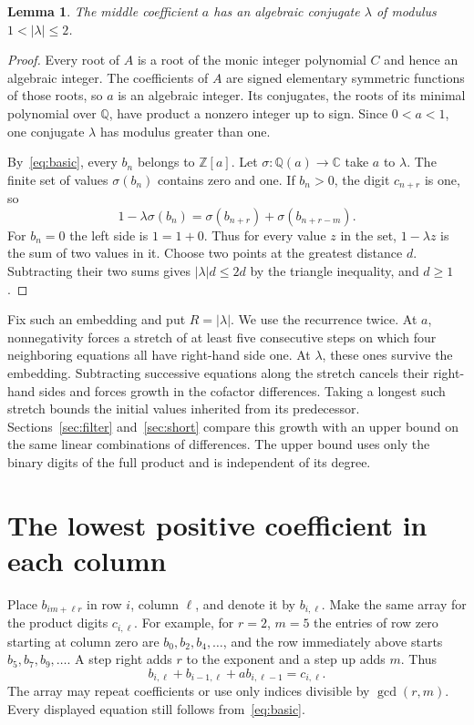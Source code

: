 \documentclass[11pt,reqno]{amsart}
\numberwithin{equation}{section}
\newtheorem{lemma}[theorem]{Lemma}
\newcommand{\Z}{\mathbb Z}
\begin{document}
\begin{lemma}\label{lem:annulus}
The middle coefficient $a$ has an algebraic conjugate $\lambda$ of modulus $1<|\lambda|\le2$.
\end{lemma}
\begin{proof}
Every root of $A$ is a root of the monic integer polynomial $C$ and hence an algebraic integer. The coefficients of $A$ are signed elementary symmetric functions of those roots, so $a$ is an algebraic integer. Its conjugates, the roots of its minimal polynomial over $\mathbb Q$, have product a nonzero integer up to sign. Since $0<a<1$, one conjugate $\lambda$ has modulus greater than one.

By~\eqref{eq:basic}, every $b_n$ belongs to $\Z[a]$. Let $\sigma:\mathbb Q(a)\to\mathbb C$ take $a$ to $\lambda$. The finite set of values $\sigma(b_n)$ contains zero and one. If $b_n>0$, the digit $c_{n+r}$ is one, so
\[
 1-\lambda\sigma(b_n)=\sigma(b_{n+r})+\sigma(b_{n+r-m}).
\]
For $b_n=0$ the left side is $1=1+0$. Thus for every value $z$ in the set, $1-\lambda z$ is the sum of two values in it. Choose two points at the greatest distance $d$. Subtracting their two sums gives $|\lambda|d\le2d$ by the triangle inequality, and $d\ge1$.
\end{proof}
Fix such an embedding and put $R=|\lambda|$. We use the recurrence twice. At $a$, nonnegativity forces a stretch of at least five consecutive steps on which four neighboring equations all have right-hand side one. At $\lambda$, these ones survive the embedding. Subtracting successive equations along the stretch cancels their right-hand sides and forces growth in the cofactor differences. Taking a longest such stretch bounds the initial values inherited from its predecessor. Sections~\ref{sec:filter} and~\ref{sec:short} compare this growth with an upper bound on the same linear combinations of differences. The upper bound uses only the binary digits of the full product and is independent of its degree.

\section{The lowest positive coefficient in each column}\label{sec:bottom}
Place $b_{im+\ell r}$ in row $i$, column $\ell$, and denote it by $b_{i,\ell}$. Make the same array for the product digits $c_{i,\ell}$. For example, for $r=2$, $m=5$ the entries of row zero starting at column zero are $b_0,b_2,b_4,\ldots$, and the row immediately above starts $b_5,b_7,b_9,\ldots$. A step right adds $r$ to the exponent and a step up adds $m$. Thus
\begin{equation}\label{eq:array}
 b_{i,\ell}+b_{i-1,\ell}+a b_{i,\ell-1}=c_{i,\ell}.
\end{equation}
The array may repeat coefficients or use only indices divisible by $\gcd(r,m)$. Every displayed equation still follows from~\eqref{eq:basic}.
\end{document}
